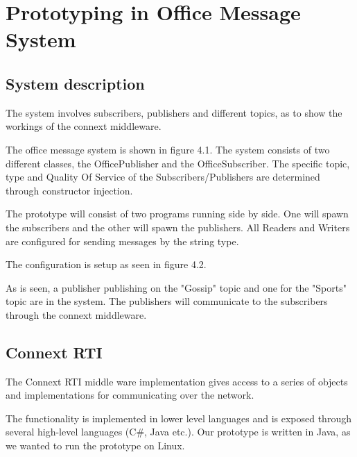 \chapter{Prototyping in Office Message System}

\section{System description}
The system involves subscribers, publishers and different topics, as to show the workings of the connext middleware. 

\begin{center}
\end{center}

The office message system is shown in figure 4.1. The system consists of two different classes, the OfficePublisher and the OfficeSubscriber. The specific topic, type and Quality Of Service of the Subscribers/Publishers are determined through constructor injection.

The prototype will consist of two programs running side by side. One will spawn the subscribers and the other will spawn the publishers. All Readers and Writers are configured for sending messages by the string type. 

The configuration is setup as seen in figure 4.2.

\begin{center}
\end{center}

As is seen, a publisher publishing on the "Gossip" topic and one for the "Sports" topic are in the system. The publishers will communicate to the subscribers through the connext middleware.

\section{Connext RTI}
The Connext RTI middle ware implementation gives access to a series of objects and implementations for communicating over the network.

The functionality is implemented in lower level languages and is exposed through several high-level languages (C\#, Java etc.). Our prototype is written in Java, as we wanted to run the prototype on Linux. 

